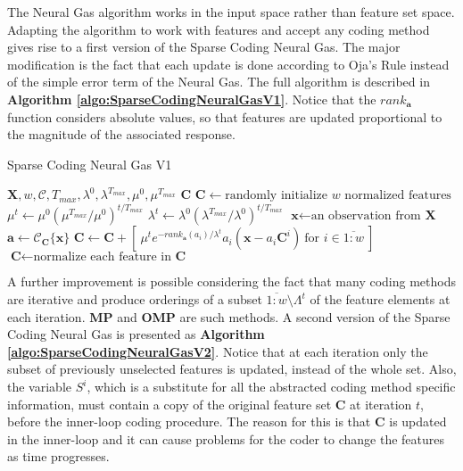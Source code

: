 \documentclass[runningheads,a4paper]{llncs}
\newcommand{\hcrange}[2]{\overline{{#1}\colon\!\!{#2}}}
\begin{document}
The Neural Gas algorithm works in the input space rather than feature set space. Adapting the algorithm to work with features and accept any coding method gives rise to a first version of the Sparse Coding Neural Gas. The major modification is the fact that each update is done according to Oja's Rule \cite{oja-rule} instead of the simple error term of the Neural Gas. The full algorithm is described in \textbf{Algorithm \ref{algo:SparseCodingNeuralGasV1}}. Notice that the $rank_{\textbf{a}}$ function considers absolute values, so that features are updated proportional to the magnitude of the associated response.

\begin{algorithm}
\caption{Sparse Coding Neural Gas V1}
\label{algo:SparseCodingNeuralGasV1}
\begin{algorithmic}
\Require $\textbf{X},w,\mathcal{C},T_{max},\lambda^0,\lambda^{T_{max}},\mu^0,\mu^{T_{max}}$
\Ensure $\textbf{C}$
\State $\textbf{C} \gets \mbox{randomly initialize $w$ normalized features}$
\For {$t = \hcrange{1}{T_{max}}$}
\State $\mu^t \gets \mu^0 (\mu^{T_{max}} / \mu^0)^{t / T_{max}}$  
\State $\lambda^t \gets \lambda^0 (\lambda^{T_{max}} / \lambda^0)^{t / T_{max}}$ 
\State $\textbf{x} \gets \text{an observation from $\textbf{X}$}$
\State $\textbf{a} \gets \mathcal{C}_{\textbf{C}}\{ \textbf{x} \}$
\State $\textbf{C} \gets \textbf{C} + [ ~ \mu^t e^{-rank_{\textbf{a}}(a_i) / \lambda^t} a_i (\textbf{x} - a_i \textbf{C}^i) ~ \mbox{for $i \in \hcrange{1}{w}$} ~ ]$
\State $\textbf{C} \gets \mbox{normalize each feature in $\textbf{C}$}$
\EndFor
\end{algorithmic}
\end{algorithm}

A further improvement is possible considering the fact that many coding methods are iterative and produce orderings of a subset $\hcrange{1}{w} \setminus \Lambda^t$ of the feature elements at each iteration. \textbf{MP} and \textbf{OMP} are such methods. A second version of the Sparse Coding Neural Gas is presented as \textbf{Algorithm \ref{algo:SparseCodingNeuralGasV2}}. Notice that at each iteration only the subset of previously unselected features is updated, instead of the whole set. Also, the variable $S^i$, which is a substitute for all the abstracted coding method specific information, must contain a copy of the original feature set $\textbf{C}$ at iteration $t$, before the inner-loop coding procedure. The reason for this is that $\textbf{C}$ is updated in the inner-loop and it can cause problems for the coder to change the features as time progresses.
\end{document}
